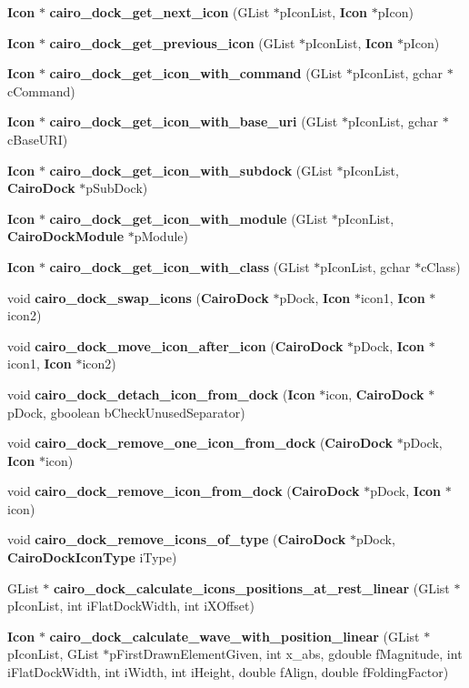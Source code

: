 \begin{CompactItemize}
\item 
{\bf Icon} $\ast$ {\bf cairo\_\-dock\_\-get\_\-next\_\-icon} (GList $\ast$p\-Icon\-List, {\bf Icon} $\ast$p\-Icon)
\item 
{\bf Icon} $\ast$ {\bf cairo\_\-dock\_\-get\_\-previous\_\-icon} (GList $\ast$p\-Icon\-List, {\bf Icon} $\ast$p\-Icon)
\item 
{\bf Icon} $\ast$ {\bf cairo\_\-dock\_\-get\_\-icon\_\-with\_\-command} (GList $\ast$p\-Icon\-List, gchar $\ast$c\-Command)
\item 
{\bf Icon} $\ast$ {\bf cairo\_\-dock\_\-get\_\-icon\_\-with\_\-base\_\-uri} (GList $\ast$p\-Icon\-List, gchar $\ast$c\-Base\-URI)
\item 
{\bf Icon} $\ast$ {\bf cairo\_\-dock\_\-get\_\-icon\_\-with\_\-subdock} (GList $\ast$p\-Icon\-List, {\bf Cairo\-Dock} $\ast$p\-Sub\-Dock)
\item 
{\bf Icon} $\ast$ {\bf cairo\_\-dock\_\-get\_\-icon\_\-with\_\-module} (GList $\ast$p\-Icon\-List, {\bf Cairo\-Dock\-Module} $\ast$p\-Module)
\item 
{\bf Icon} $\ast$ {\bf cairo\_\-dock\_\-get\_\-icon\_\-with\_\-class} (GList $\ast$p\-Icon\-List, gchar $\ast$c\-Class)
\item 
void {\bf cairo\_\-dock\_\-swap\_\-icons} ({\bf Cairo\-Dock} $\ast$p\-Dock, {\bf Icon} $\ast$icon1, {\bf Icon} $\ast$icon2)
\item 
void {\bf cairo\_\-dock\_\-move\_\-icon\_\-after\_\-icon} ({\bf Cairo\-Dock} $\ast$p\-Dock, {\bf Icon} $\ast$icon1, {\bf Icon} $\ast$icon2)
\item 
void {\bf cairo\_\-dock\_\-detach\_\-icon\_\-from\_\-dock} ({\bf Icon} $\ast$icon, {\bf Cairo\-Dock} $\ast$p\-Dock, gboolean b\-Check\-Unused\-Separator)
\item 
void {\bf cairo\_\-dock\_\-remove\_\-one\_\-icon\_\-from\_\-dock} ({\bf Cairo\-Dock} $\ast$p\-Dock, {\bf Icon} $\ast$icon)
\item 
void {\bf cairo\_\-dock\_\-remove\_\-icon\_\-from\_\-dock} ({\bf Cairo\-Dock} $\ast$p\-Dock, {\bf Icon} $\ast$icon)
\item 
void {\bf cairo\_\-dock\_\-remove\_\-icons\_\-of\_\-type} ({\bf Cairo\-Dock} $\ast$p\-Dock, {\bf Cairo\-Dock\-Icon\-Type} i\-Type)
\item 
GList $\ast$ {\bf cairo\_\-dock\_\-calculate\_\-icons\_\-positions\_\-at\_\-rest\_\-linear} (GList $\ast$p\-Icon\-List, int i\-Flat\-Dock\-Width, int i\-XOffset)
\item 
{\bf Icon} $\ast$ {\bf cairo\_\-dock\_\-calculate\_\-wave\_\-with\_\-position\_\-linear} (GList $\ast$p\-Icon\-List, GList $\ast$p\-First\-Drawn\-Element\-Given, int x\_\-abs, gdouble f\-Magnitude, int i\-Flat\-Dock\-Width, int i\-Width, int i\-Height, double f\-Align, double f\-Folding\-Factor)

\end{CompactItemize}
